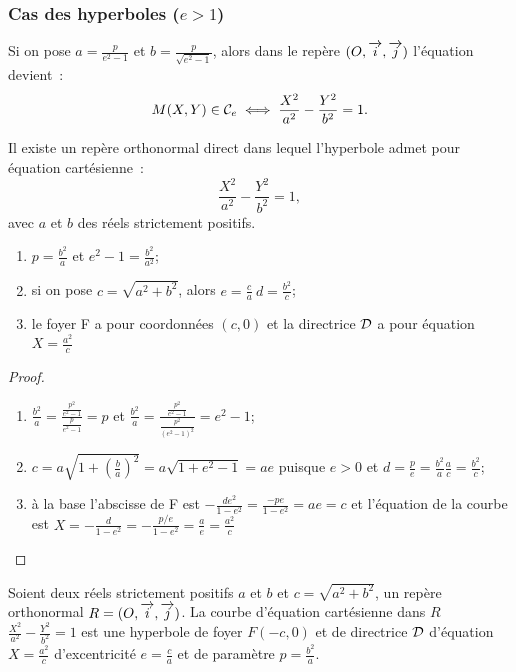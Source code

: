\subsubsection{Cas des hyperboles (\(e>1\))}
Si on pose \(a = \frac{p}{e^2-1}\) et \(b = \frac{p}{\sqrt{e^2-1}}\), alors dans le 
repère \((O,\overrightarrow{i},\overrightarrow{j})\) l'équation devient~:
\begin{equation}
  M(X, Y) \in \mathcal{C}_{e} \iff \frac{X^2}{a^2}-\frac{Y^2}{b^2} = 1.
\end{equation}
\begin{theo}
  Il existe un repère orthonormal direct dans lequel l'hyperbole admet pour 
  équation cartésienne~:
  \begin{equation}
    \frac{X^2}{a^2}-\frac{Y^2}{b^2} = 1,
  \end{equation}
  avec \(a\) et \(b\) des réels strictement positifs.
\end{theo}
\begin{prop}
  \begin{enumerate}
    \item \(p = \frac{b^2}{a}\) et \(e^2-1 = \frac{b^2}{a^2}\);
    \item si on pose \(c = \sqrt{a^2 + b^2}\), alors \(e = \frac{c}{a} \ 
      d = \frac{b^2}{c}\);
    \item le foyer F a pour coordonnées \((c, 0)\) et la directrice \(\mathcal{D}\) a 
      pour équation \(X = \frac{a^2}{c}\)
  \end{enumerate}
\end{prop}
\begin{proof}
  \begin{enumerate}
    \item \(\frac{b^2}{a} = \frac{\frac{p^2}{e^2-1}}{\frac{p}{e^2-1}} = p\) et 
      \(\frac{b^2}{a} = \frac{\frac{p^2}{e^2-1}}{\frac{p^2}{(e^2-1)^2}} = e^2-1\);
    \item \(c = a\sqrt{1 + \left(\frac{b}{a}\right)^2} = a\sqrt{1 + e^2-1} = ae\) puisque 
      \(e>0\) et \(d = \frac{p}{e} = \frac{b^2}{a} \frac{a}{c} = \frac{b^2}{c}\);
    \item à la base l'abscisse de F est 
      \(-\frac{de^2}{1-e^2} = \frac{-pe}{1-e^2} = ae = c\) et l'équation de la courbe 
      est \(X = -\frac{d}{1-e^2} = -\frac{p/e}{1-e^2} = \frac{a}{e} = \frac{a^2}{c}\)
  \end{enumerate}
\end{proof}
\begin{theo}
  Soient deux réels strictement positifs \(a\) et \(b\) et \(c = \sqrt{a^2 + b^2}\), 
  un repère orthonormal \(R = (O,\overrightarrow{i},\overrightarrow{j})\). La courbe d'équation cartésienne dans \(R\) 
  \(\frac{X^2}{a^2}-\frac{Y^2}{b^2} = 1\) est une hyperbole de foyer \(F(-c, 0)\) 
  et de directrice \(\mathcal{D}\) d'équation \(X = \frac{a^2}{c}\) d'excentricité 
  \(e = \frac{c}{a}\) et de paramètre \(p = \frac{b^2}{a}\).
\end{theo}

